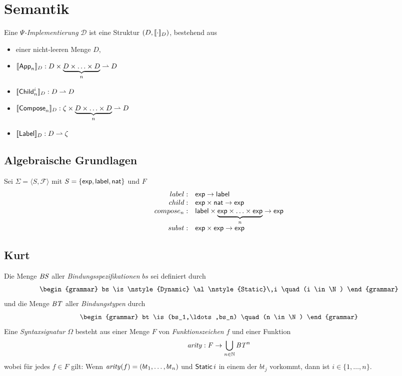 \documentclass[12pt,a4paper]{article}
\begin{document}
\section*{Semantik}

Eine \emph{$\Psi$-Implementierung} $\mathcal{D}$ ist eine Struktur $(D,[\![\cdot]\!]_D)$, bestehend aus
\begin{itemize}
\item einer nicht-leeren Menge $D$,
\item $[\![\mathsf{App}_n]\!]_D: D \times \underbrace{D \times \ldots \times D}_n \rightharpoonup D$
\item $[\![\mathsf{Child}_n^i]\!]_D: D \rightharpoonup D$
\item $[\![\mathsf{Compose}_n]\!]_D: \zeta \times \underbrace{D \times \ldots \times D}_n \rightharpoonup D$
\item $[\![\mathsf{Label}]\!]_D: D \rightharpoonup \zeta$
\end{itemize}


\clearpage


\subsection*{Algebraische Grundlagen}

Sei $\Sigma = \langle S, \mathcal{F} \rangle$ mit 
$S = \{\mathsf{exp},\mathsf{label},\mathsf{nat}\}$ und $F$
\[\begin{array}{rl}
label:& \mathsf{exp} \to \mathsf{label}\\
child:& \mathsf{exp} \times \mathsf{nat} \to \mathsf{exp}\\
compose_n:& \mathsf{label} \times \underbrace{\mathsf{exp} \times \ldots \times \mathsf{exp}}_n \to \mathsf{exp}\\
subst:& \mathsf{exp} \times \mathsf{exp} \to \mathsf{exp}\\
\end{array}\]


\subsection*{Kurt}

Die Menge $\mathit{BS}$ aller \emph{Bindungsspezifikationen} $bs$ sei definiert durch
\[\begin{grammar}
bs
\is \nstyle{Dynamic}
\al \nstyle{Static}\,i \quad (i \in \N)
\end{grammar}\]
und die Menge $\mathit{BT}$ aller \emph{Bindungstypen} durch
\[\begin{grammar}
bt \is (bs_1,\ldots,bs_n) \quad (n \in \N)
\end{grammar}\]
Eine \emph{Syntaxsignatur} $\Omega$ besteht aus einer Menge $F$ von \emph{Funktionszeichen} $f$
und einer Funktion
\[
\mathit{arity}: F \to \bigcup_{n\in\mathbb N}\mathit{BT}^n
\]
wobei f\"ur jedes $f \in F$ gilt: Wenn $\mathit{arity}(f) = (bt_1,\ldots,bt_n)$ und
$\mathsf{Static}\,i$ in einem der $bt_j$ vorkommt, dann ist $i \in \{1,\ldots,n\}$.
\end{document}
